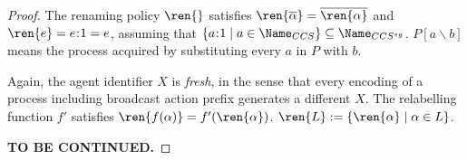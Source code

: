 \begin{proof}
  The renaming policy $\ren{}$ satisfies $\ren{\overline{\alpha}} = \overline{\ren{\alpha}}$ and $\ren{e} = e\hspace{-0.8mm}:\hspace{-0.8mm}1 = e$, assuming that $\{a\hspace{-0.8mm}:\hspace{-0.8mm}1 \mid a \in \Name_{CCS} \}\subseteq \Name_{CCS^{sg}}$.
  $P[a\backslash b]$ means the process acquired by substituting every $a$ in $P$ with $b$.

  Again, the agent identifier $X$ is \emph{fresh}, in the sense that every encoding of a process including broadcast action prefix generates a different $X$.
  The relabelling function $f'$ satisfies $\ren{f(\alpha)}=f'(\ren{\alpha})$.
  $\ren{L}:=\{\ren{\alpha}\mid\alpha\in L\}$.

  \textbf{TO BE CONTINUED. }
\end{proof}



